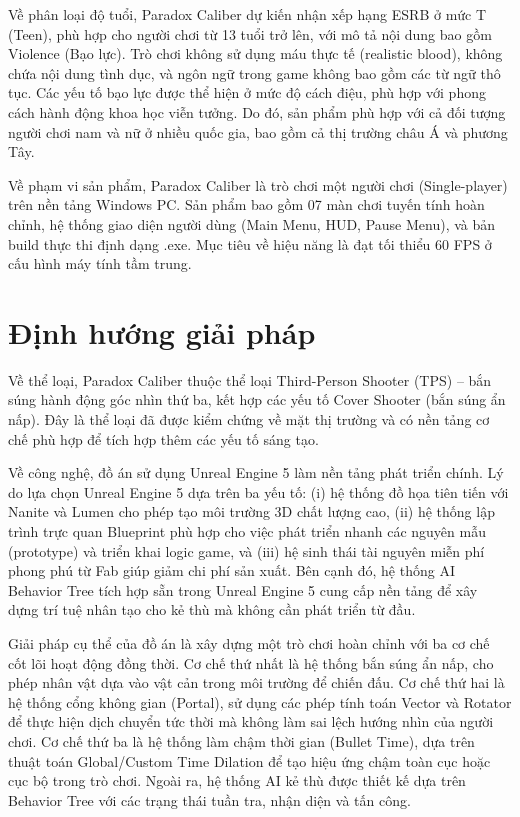 \documentclass[../DoAn.tex]{subfiles}
\begin{document}
Về phân loại độ tuổi, Paradox Caliber dự kiến nhận xếp hạng ESRB ở mức T (Teen), phù hợp cho người chơi từ 13 tuổi trở lên, với mô tả nội dung bao gồm Violence (Bạo lực). Trò chơi không sử dụng máu thực tế (realistic blood), không chứa nội dung tình dục, và ngôn ngữ trong game không bao gồm các từ ngữ thô tục. Các yếu tố bạo lực được thể hiện ở mức độ cách điệu, phù hợp với phong cách hành động khoa học viễn tưởng. Do đó, sản phẩm phù hợp với cả đối tượng người chơi nam và nữ ở nhiều quốc gia, bao gồm cả thị trường châu Á và phương Tây.

Về phạm vi sản phẩm, Paradox Caliber là trò chơi một người chơi (Single-player) trên nền tảng Windows PC. Sản phẩm bao gồm 07 màn chơi tuyến tính hoàn chỉnh, hệ thống giao diện người dùng (Main Menu, HUD, Pause Menu), và bản build thực thi định dạng .exe. Mục tiêu về hiệu năng là đạt tối thiểu 60 FPS ở cấu hình máy tính tầm trung.

\section{Định hướng giải pháp}
\label{section:1.4}

Về thể loại, Paradox Caliber thuộc thể loại Third-Person Shooter (TPS) -- bắn súng hành động góc nhìn thứ ba, kết hợp các yếu tố Cover Shooter (bắn súng ẩn nấp). Đây là thể loại đã được kiểm chứng về mặt thị trường và có nền tảng cơ chế phù hợp để tích hợp thêm các yếu tố sáng tạo.

Về công nghệ, đồ án sử dụng Unreal Engine 5 làm nền tảng phát triển chính. Lý do lựa chọn Unreal Engine 5 dựa trên ba yếu tố: (i) hệ thống đồ họa tiên tiến với Nanite và Lumen cho phép tạo môi trường 3D chất lượng cao, (ii) hệ thống lập trình trực quan Blueprint phù hợp cho việc phát triển nhanh các nguyên mẫu (prototype) và triển khai logic game, và (iii) hệ sinh thái tài nguyên miễn phí phong phú từ Fab giúp giảm chi phí sản xuất. Bên cạnh đó, hệ thống AI Behavior Tree tích hợp sẵn trong Unreal Engine 5 cung cấp nền tảng để xây dựng trí tuệ nhân tạo cho kẻ thù mà không cần phát triển từ đầu.

Giải pháp cụ thể của đồ án là xây dựng một trò chơi hoàn chỉnh với ba cơ chế cốt lõi hoạt động đồng thời. Cơ chế thứ nhất là hệ thống bắn súng ẩn nấp, cho phép nhân vật dựa vào vật cản trong môi trường để chiến đấu. Cơ chế thứ hai là hệ thống cổng không gian (Portal), sử dụng các phép tính toán Vector và Rotator để thực hiện dịch chuyển tức thời mà không làm sai lệch hướng nhìn của người chơi. Cơ chế thứ ba là hệ thống làm chậm thời gian (Bullet Time), dựa trên thuật toán Global/Custom Time Dilation để tạo hiệu ứng chậm toàn cục hoặc cục bộ trong trò chơi. Ngoài ra, hệ thống AI kẻ thù được thiết kế dựa trên Behavior Tree với các trạng thái tuần tra, nhận diện và tấn công.
\end{document}
